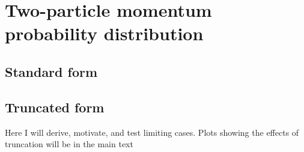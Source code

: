 \chapter{Two-particle momentum probability distribution}
\label{ch:momDistDer}

\section{Standard form}
\label{sec:standardDist}

\section{Truncated form}
\label{sec:truncDist}

Here I will derive, motivate, and test limiting cases. Plots showing the effects of truncation will be in the main text